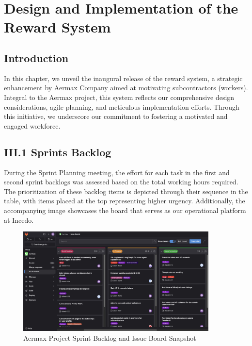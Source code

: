 \chapter{Design and Implementation of the Reward System}
\minitoc
\newpage

\setcounter{secnumdepth}{0} %
\section{Introduction}

In this chapter, we unveil the inaugural release of the reward system, a strategic enhancement by Aermax Company aimed at motivating subcontractors (workers). Integral to the Aermax project, this system reflects our comprehensive design considerations, agile planning, and meticulous implementation efforts. Through this initiative, we underscore our commitment to fostering a motivated and engaged workforce.

\section{III.1 Sprints Backlog}
During the Sprint Planning meeting, the effort for each task in the first and second sprint backlogs was assessed based on the total working hours required. The prioritization of these backlog items is depicted through their sequence in the table, with items placed at the top representing higher urgency. Additionally, the accompanying image showcases the board that serves as our operational platform at Incedo.

 \begin{figure}[H]
    \centering
    \includegraphics[width=0.9\textwidth]{src/assets/chapters/reward-system-backloog.png}
    \caption{Aermax Project Sprint Backlog and Issue Board Snapshot}
    \label{fig:sprint_backlog_and_issue_board}
\end{figure}


